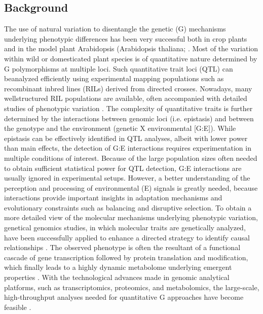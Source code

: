 \subsection{Background}
The use of natural variation to disentangle the genetic (G) mechanisms underlying phenotypic differences 
has been very successful both in crop plants and in the model plant Arabidopsis (Arabidopsis thaliana; 
\cite{Alonso-Blanco:2009}. Most of the variation within wild or domesticated plant species is of 
quantitative nature determined by G polymorphisms at multiple loci. Such quantitative trait loci (QTL) 
can beanalyzed efficiently using experimental mapping populations such as recombinant inbred lines (RILs)
derived from directed crosses. Nowadays, many wellstructured RIL populations are available, often 
accompanied with detailed studies of phenotypic variation \cite{Mitchell-Olds:2006}. The complexity 
of quantitative traits is further determined by the interactions between genomic loci (i.e. epistasis) and 
between the genotype and the environment (genetic X environmental [G:E]). While epistasis can be effectively
identified in QTL analyses, albeit with lower power than main effects, the detection of G:E interactions 
requires experimentation in multiple conditions of interest. Because of the large population sizes often 
needed to obtain sufficient statistical power for QTL detection, G:E interactions are usually ignored in 
experimental setups. However, a better understanding of the perception and processing of environmental (E)
signals is greatly needed, because interactions provide important insights in adaptation mechanisms and
evolutionary constraints such as balancing and disruptive selection. To obtain a more detailed view of the
molecular mechanisms underlying phenotypic variation, genetical genomics studies, in which molecular traits
are genetically analyzed, have been successfully applied to enhance a directed strategy to identify causal
relationships \cite{West:2007, Keurentjes:2007, Kliebenstein:2006, Rowe:2008}. The observed phenotype is often the resultant 
of a functional cascade of gene transcription followed by protein translation and modification, which 
finally leads to a highly dynamic metabolome underlying emergent properties \cite{Kooke:2012}. 
With the technological advances made in genomic analytical platforms, such as transcriptomics, proteomics, 
and metabolomics, the large-scale, high-throughput analyses needed for quantitative G approaches have 
become feasible \cite{Jansen:2001a}. 

